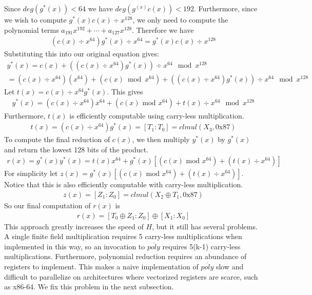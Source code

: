 \documentclass[hctr.tex]{subfiles}
\begin{document}
Since $deg(g^*(x)) < 64$ we have $deg(g^(x)c(x)) < 192$. Furthermore, since we wish to compute $g^*(x)c(x) \div x^{128}$, we only need to compute the polynomial terms $a_{191}x^{192} + \cdots + a_{127}x^{128}$. Therefore we have
\begin{align*}
       (c(x) \div x^{64})g^*(x) \div x^{64} = g^*(x)c(x) \div x^{128}
\end{align*}
Substituting this into our original equation gives:
\begin{gather*}
       y^*(x) = c(x) + ((c(x) \div x^{64})g^*(x)) \div x^{64} \mod x^{128}\\
       = (c(x) \div x^{64})(x^{64}) + (c(x) \bmod x^{64}) + ((c(x) \div x^{64})g^*(x)) \div x^{64} \mod x^{128}
\end{gather*}
Let $t(x) = c(x) \div x^{64}g^*(x)$. This gives
\begin{align*}
       y^*(x) = (c(x) \div x^{64})x^{64} + (c(x) \text{ mod } x^{64}) + t(x) \div x^{64} \mod x^{128}
\end{align*}
Furthermore, $t(x)$ is efficiently computable using carry-less multiplication.
\begin{align*}
       t(x) = (c(x) \div x^{64})g^*(x) = [T_1 : T_0] = clmul(X_3, \text{0x87})
\end{align*}
To compute the final reduction of $c(x)$, we then multiply $y^*(x)$ by $g^*(x)$ and return the lowest 128 bits of the product.
\begin{align*}
       r(x) = g^*(x)y^*(x) = t(x)x^{64} + g^*(x)\left[(c(x) \text{ mod } x^{64}) + (t(x) \div x^{64})\right]
\end{align*}
For simplicity let $z(x) = g^*(x)\left[(c(x) \text{ mod } x^{64}) + (t(x) \div x^{64})\right]$. Notice that this is also efficiently computable with carry-less multiplication.
\begin{align*}
       z(x) = [Z_1 : Z_0] = clmul(X_2 \oplus T_1,\text{0x87})
\end{align*}
So our final computation of $r(x)$ is
\begin{align*}
       r(x) = [T_0 \oplus Z_1 : Z_0] \oplus [X_1 : X_0]
\end{align*}
This approach greatly increases the speed of $H$, but it still has several problems. A single finite field multiplication requires 5 carry-less multiplications when implemented in this way, so an invocation to $\overline{poly}$ requires 5(k-1) carry-less multiplications. Furthermore, polynomial reduction requires an abundance of registers to implement. This makes a naive implementation of $\overline{poly}$ slow and difficult to parallelize on architectures where vectorized registers are scarce, such as x86-64. We fix this problem in the next subsection.
\end{document}
